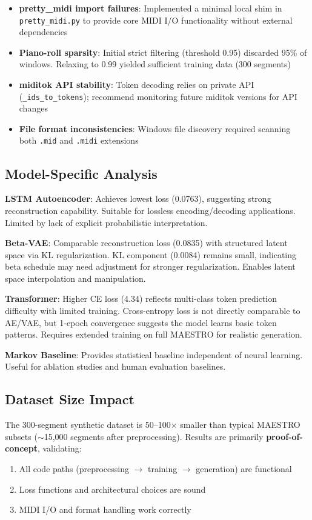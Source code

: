 \documentclass[conference]{IEEEtran}
\begin{document}
\begin{itemize}
    \item \textbf{pretty\_midi import failures}: Implemented a minimal local shim in \texttt{pretty\_midi.py} to provide core MIDI I/O functionality without external dependencies
    \item \textbf{Piano-roll sparsity}: Initial strict filtering (threshold 0.95) discarded 95\% of windows. Relaxing to 0.99 yielded sufficient training data (300 segments)
    \item \textbf{miditok API stability}: Token decoding relies on private API (\texttt{\_ids\_to\_tokens}); recommend monitoring future miditok versions for API changes
    \item \textbf{File format inconsistencies}: Windows file discovery required scanning both \texttt{.mid} and \texttt{.midi} extensions
\end{itemize}

\subsection{Model-Specific Analysis}
\textbf{LSTM Autoencoder}: Achieves lowest loss (0.0763), suggesting strong reconstruction capability. Suitable for lossless encoding/decoding applications. Limited by lack of explicit probabilistic interpretation.

\textbf{Beta-VAE}: Comparable reconstruction loss (0.0835) with structured latent space via KL regularization. KL component (0.0084) remains small, indicating beta schedule may need adjustment for stronger regularization. Enables latent space interpolation and manipulation.

\textbf{Transformer}: Higher CE loss (4.34) reflects multi-class token prediction difficulty with limited training. Cross-entropy loss is not directly comparable to AE/VAE, but 1-epoch convergence suggests the model learns basic token patterns. Requires extended training on full MAESTRO for realistic generation.

\textbf{Markov Baseline}: Provides statistical baseline independent of neural learning. Useful for ablation studies and human evaluation baselines.

\subsection{Dataset Size Impact}
The 300-segment synthetic dataset is 50--100$\times$ smaller than typical MAESTRO subsets ($\sim$15,000 segments after preprocessing). Results are primarily \textbf{proof-of-concept}, validating:
\begin{enumerate}
    \item All code paths (preprocessing $\rightarrow$ training $\rightarrow$ generation) are functional
    \item Loss functions and architectural choices are sound
    \item MIDI I/O and format handling work correctly
\end{enumerate}
\end{document}

